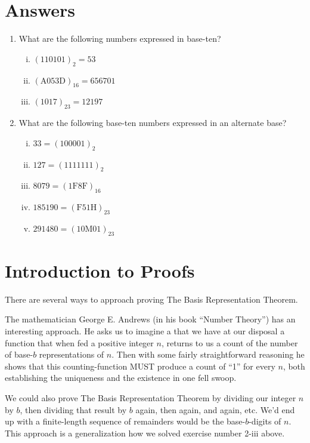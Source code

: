 \documentclass{article}
\begin{document}
\section*{Answers}
\begin{enumerate}
\item What are the following numbers expressed in base-ten?
\begin{enumerate}[i)]
\item $(110101)_2 = 53$
\item $(\text{A}053\text{D})_{16}=656701$
\item $(1017)_{23} = 12197$
\end{enumerate}
\item What are the following base-ten numbers expressed in an alternate base?
\begin{enumerate}[i)]
\item $33 = (100001)_2$
\item $127 = (1111111)_2$
\item $8079 = (1\text{F}8\text{F})_{16}$
\item $185190 = (\text{F}51\text{H})_{23}$
\item $291480 = (10\text{M}01)_{23}$
\end{enumerate}
\end{enumerate}

\break
\section*{Introduction to Proofs}

There are several ways to approach
proving The Basis Representation Theorem.

The mathematician George E. Andrews (in his book
``Number Theory'') has an interesting approach.
He asks us to imagine a that we have at our disposal a function that when fed a positive integer $n$,
returns to us a count of the number of base-$b$ representations of $n$.
Then with some fairly straightforward reasoning he shows that this counting-function
MUST produce a count of ``1'' for every $n$, both establishing the uniqueness 
and the existence in one fell swoop.

We could also prove The Basis Representation Theorem by dividing our integer $n$ by $b$, then dividing that
result by $b$ again, then again, and again, etc. We'd end up with a finite-length sequence
of remainders would be the base-$b$-digits of $n$.
This approach is a
generalization how we solved
exercise number 2-iii above.
\end{document}
